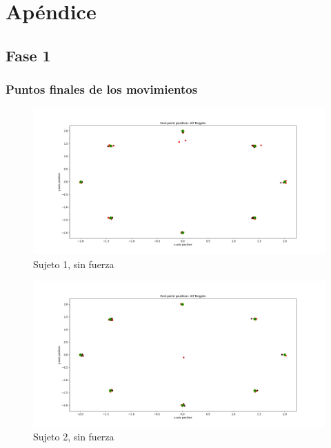 \documentclass[a4paper,11pt, oneside]{book}
\begin{document}





\appendix

\chapter{Apéndice}


\section{Fase 1}
\subsection{Puntos finales de los movimientos}

\begin{figure}[H]
	\centering
	\includegraphics[width=\linewidth]{sujeto1/no_force/trayectorias_puntos}
	\caption{Sujeto 1, sin fuerza}
	\label{1-1-1}
\end{figure}
\begin{figure}[H]
	\centering
	\includegraphics[width=\linewidth]{sujeto2/no_force/trayectorias_puntos}
	\caption{Sujeto 2, sin fuerza}
	\label{2-1-1}
\end{figure}
\end{document}
